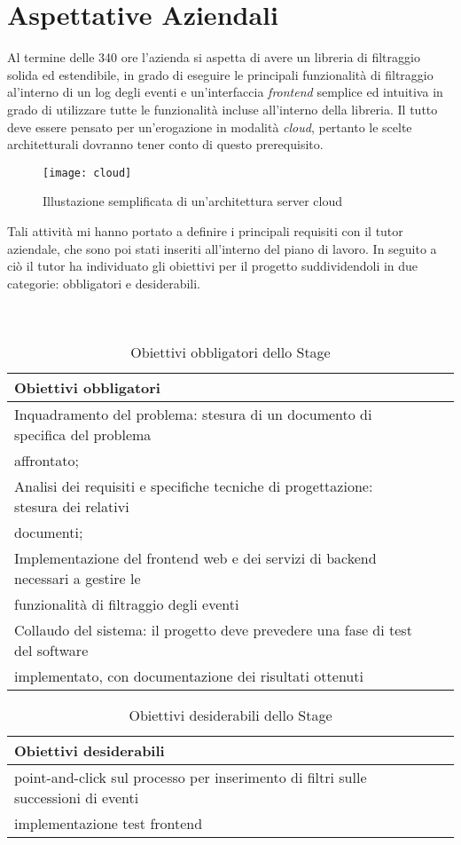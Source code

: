 \section{Aspettative Aziendali}
Al termine delle 340 ore l'azienda si aspetta di avere un libreria di filtraggio solida ed estendibile, in grado di eseguire le principali funzionalità di filtraggio al'interno di un log degli eventi e un'interfaccia \textit{frontend} semplice ed intuitiva in grado di utilizzare tutte le funzionalità incluse all'interno della libreria.
Il tutto deve essere pensato per un’erogazione in modalità \textit{cloud}, pertanto le scelte architetturali dovranno tener conto di questo prerequisito.
\begin{figure}[!h] 
	\centering 
	\texttt{[image: cloud]} 
	\caption{Illustazione semplificata di un'architettura server cloud}
\end{figure}
Tali attività mi hanno portato a definire i principali requisiti con il tutor aziendale, che sono poi stati inseriti all'interno del piano di lavoro. In seguito a ciò il tutor ha individuato gli obiettivi per il progetto suddividendoli in due categorie: obbligatori e desiderabili.\\
\\
\\
\begin{table}[!h]
	\caption{Obiettivi obbligatori dello Stage}
\begin{tabularx}{\textwidth}{lXl}
	\hline\hline
	\textbf{Obiettivi obbligatori}\\
	\hline
	Inquadramento del problema: stesura di un documento di specifica del problema\\
	affrontato; &  \\
	\hline
	\hline
     Analisi dei requisiti e specifiche tecniche di progettazione: stesura dei relativi\\
     documenti; &  \\
	\hline
	\hline
	Implementazione del frontend web e dei servizi di backend necessari a gestire le\\
	funzionalità di filtraggio degli eventi &  \\
	\hline
	\hline
	Collaudo del sistema: il progetto deve prevedere una fase di test del software\\
	implementato, con documentazione dei risultati ottenuti &  \\
	\hline	
\end{tabularx}
\end{table}
\begin{table}[!h]
	\caption{Obiettivi desiderabili dello Stage}
	\begin{tabularx}{\textwidth}{lXl}
		\hline\hline
		\textbf{Obiettivi desiderabili}\\
		\hline
		point-and-click sul processo per inserimento di filtri sulle successioni di eventi&  \\
		\hline
		\hline
		implementazione test frontend &  \\
		\hline
	\end{tabularx}
\end{table}
